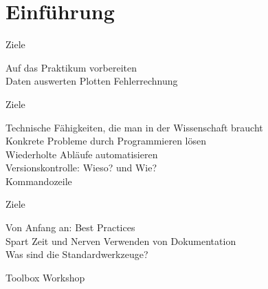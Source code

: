 \section{Einführung}

\begin{frame}{Ziele}
  \begin{center}
    \textcolor{vertexDarkRed}{\Huge Auf das Praktikum vorbereiten} \\[3ex]
    \Large Daten auswerten \hspace{2em} Plotten \hspace{2em} Fehlerrechnung
  \end{center}
\end{frame}

\begin{frame}{Ziele}
  \begin{center}
    \textcolor{vertexDarkRed}{\Huge Technische Fähigkeiten, die man in der Wissenschaft braucht} \\[3ex]
    \Large%
    Konkrete Probleme durch Programmieren lösen\\[2ex]
    Wiederholte Abläufe automatisieren\\[2ex]
    Versionskontrolle: Wieso? und Wie?\\[2ex]
    Kommandozeile
  \end{center}
\end{frame}

\begin{frame}{Ziele}
  \begin{center}
    \textcolor{vertexDarkRed}{\Huge Von Anfang an: Best Practices} \\[3ex]
    \Large%
    Spart Zeit und Nerven\hspace{2em}
    Verwenden von Dokumentation\\[2ex]
    Was sind die Standardwerkzeuge?
  \end{center}
\end{frame}

\begin{frame}
  \vspace*{1cm}
  \begin{center}
    \Huge Toolbox Workshop
  \end{center}
\end{frame}

